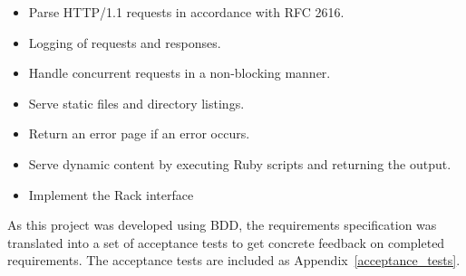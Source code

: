 \begin{itemize}
  \item Parse HTTP/1.1 requests in accordance with RFC 2616.
  \item Logging of requests and responses.
  \item Handle concurrent requests in a non-blocking manner.
  \item Serve static files and directory listings.
  \item Return an error page if an error occurs.
  \item Serve dynamic content by executing Ruby scripts and returning the
  output.
  \item Implement the Rack interface
\end{itemize}

As this project was developed using BDD, the requirements specification was
translated into a set of acceptance tests to get concrete feedback on
completed requirements. The acceptance tests are included as
Appendix~\ref{acceptance_tests}.
